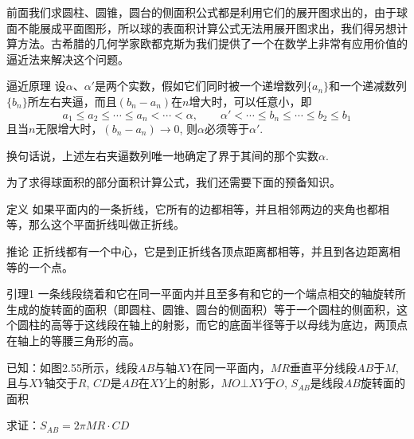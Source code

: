 前面我们求圆柱、圆锥，圆台的侧面积公式都是利用它们的展开图求出的，由于球面不能展成平面图形，所以球的表面积计算公式无法用展开图求出，我们得另想计算方法。古希腊的几何学家欧都克斯为我们提供了一个在数学上非常有应用价值的逼近法来解决这个问题。

\begin{blk}
 {逼近原理} 设$\alpha$、$\alpha'$是两个实数，假如它们同时被一个递增数列$\{a_n\}$和一个递减数列$\{b_n\}$所左右夹逼，而且$(b_n -a_n)$在$n$增大时，可以任意小，即
\[a_1\le a_2\le \cdots\le a_n<\cdots<\alpha,\qquad \alpha'<\cdots\le b_n\le \cdots\le b_2\le b_1\] 
 且当$n$无限增大时，$(b_n-a_n)\to 0$, 则$\alpha$必须等于$\alpha'$.   
\end{blk}

换句话说，上述左右夹逼数列唯一地确定了界于其间的那个实数$\alpha$.

为了求得球面积的部分面积计算公式，我们还需要下面的预备知识。

\begin{blk}
  {定义} 如果平面内的一条折线，它所有的边都相等，并且相邻两边的夹角也都相等，那么这个平面折线叫做正折线。
\end{blk}

\begin{blk}
   {推论} 正折线都有一个中心，它是到正折线各顶点距离都相等，并且到各边距离相等的一个点。   
\end{blk}


\begin{blk}
    {引理1} 一条线段绕着和它在同一平面内并且至多有和它的一个端点相交的轴旋转所生成的旋转面的面积（即圆柱、圆锥、圆台的侧面积）等于一个圆柱的侧面积，这个圆柱的高等于这线段在轴上的射影，而它的底面半径等于以母线为底边，两顶点在轴上的等腰三角形的高。
\end{blk}

已知：如图2.55所示，线段$AB$与轴$XY$在同一平面内，$MR$垂直平分线段$AB$于$M$, 且与$XY$轴交于$R$, $CD$是$AB$在$XY$上的射影，$MO\bot XY$于$O$, $S_{AB}$是线段$AB$旋转面的面积

求证：$S_{AB}=2\pi MR\cdot CD$

